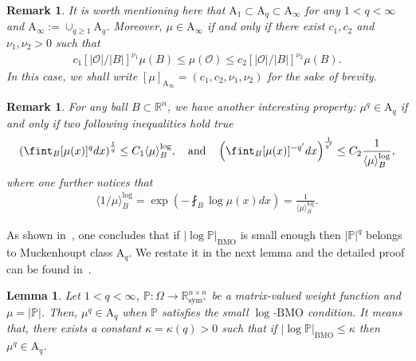 \documentclass[a4paper, 11pt]{article}
\newtheorem{lemma}[theorem]{Lemma}
\newtheorem{remark}[theorem]{Remark}
\begin{document}
\begin{remark}
It is worth mentioning here that $\mathrm{A}_{1} \subset \mathrm{A}_{q} \subset \mathrm{A}_{\infty}$ for any $1<q<\infty$ and $\mathrm{A}_{\infty}:= \cup_{q \ge 1} \mathrm{A}_{q}$. Moreover, $\mu \in \mathrm{A}_{\infty}$ if and only if there exist $c_1, c_2$ and $\nu_1,\nu_2>0$ such that
\begin{align}\label{Muck-w}
c_1 \left[{|\mathcal{O}|}/{|B|}\right]^{\nu_1} \mu(B)  \le \mu(\mathcal{O}) \le c_2 \left[{|\mathcal{O}|}/{|B|}\right]^{\nu_2} \mu(B). 
\end{align}
In this case, we shall write $[\mu]_{\mathrm{A}_\infty} = (c_1,c_2,\nu_1,\nu_2)$ for the sake of brevity.
\end{remark}

\begin{remark}
For any ball $B \subset \mathbb{R}^n$, we have another interesting property: $\mu^q \in \mathrm{A}_{q}$ if and only if two following inequalities hold true
\begin{align}\notag
\left(\fint_B [\mu(x)]^q dx \right)^{\frac{1}{q}} \le C_1 \langle \mu\rangle_B^{\log}, \quad \text{and} \quad \left(\fint_B [\mu(x)]^{-q'} dx \right)^{\frac{1}{q'}} \le C_2 \frac{1}{\langle \mu\rangle_B^{\log}},
\end{align}
where one further notices that
\begin{align*}
\langle 1/\mu\rangle_B^{\log} = \exp\left(-\fint_B \log \mu(x) dx\right) = \frac{1}{\langle \mu\rangle_B^{\log}}. 
\end{align*}
\end{remark}

As shown in~\cite{BBDL2023}, one concludes that if $|\log \mathbb{P}|_{\mathrm{BMO}}$ is small enough then $|\mathbb{P}|^q$ belongs to Muckenhoupt class $\mathrm{A}_q$. We restate it in the next lemma and the detailed proof can be found in~\cite{BDGN2022}.
\begin{lemma}\label{lem:Pi}
Let $1<q<\infty$, $\mathbb{P}: \Omega \to \mathbb{R}^{n \times n}_{\mathrm{sym}^+}$ be a matrix-valued weight function and $\mu = |\mathbb{P}|$. Then, $\mu^q \in \mathrm{A}_q$ when $\mathbb{P}$ satisfies the small $\log$-$\mathrm{BMO}$ condition. It means that, there exists a constant $\kappa = \kappa(q)>0$ such that if $|\log \mathbb{P}|_{\mathrm{BMO}} \le \kappa$ then $\mu^q \in \mathrm{A}_q$.
\end{lemma}
\end{document}
